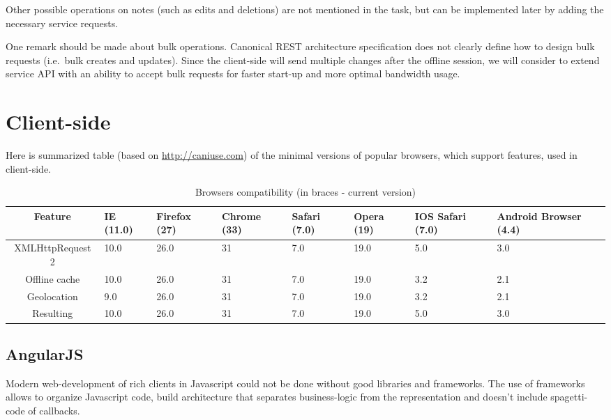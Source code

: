 \documentclass[12pt,a4paper]{article}
\begin{document}
Other possible operations on notes (such as edits and deletions) are
not mentioned in the task, but can be implemented later by adding the
necessary service requests.

One remark should be made about bulk operations. Canonical REST
architecture specification does not clearly define how to design bulk
requests (i.e.\ bulk creates and updates). Since the client-side will
send multiple changes after the offline session, we will consider to
extend service API with an ability to accept bulk requests for faster
start-up and more optimal bandwidth usage.

\section{Client-side}

Here is summarized table (based on \url{http://caniuse.com}) of the minimal
versions of popular browsers, which support features, used in client-side.

\begin{table}[h!]
    \caption{Browsers compatibility (in braces - current version)}
    \begin{tabularx}{\linewidth}{|c|X|X|X|X|X|X|X|}
        \hline
        Feature & IE (11.0) & Firefox (27) & Chrome (33) & Safari (7.0) & Opera (19) & IOS Safari (7.0) & Android Browser (4.4) \\ \hline
        XMLHttpRequest 2 & 10.0 & 26.0 & 31 & 7.0 & 19.0 & 5.0 & 3.0 \\ \hline
        Offline cache    & 10.0 & 26.0 & 31 & 7.0 & 19.0 & 3.2 & 2.1 \\ \hline
        Geolocation      &  9.0 & 26.0 & 31 & 7.0 & 19.0 & 3.2 & 2.1 \\ \hline
        \hline
        Resulting        & 10.0 & 26.0 & 31 & 7.0 & 19.0 & 5.0 & 3.0 \\ \hline
    \end{tabularx}
\end{table}

\subsection{AngularJS}
Modern web-development of rich clients in Javascript could not be done without
good libraries and frameworks. The use of frameworks allows to organize
Javascript code, build architecture that separates business-logic from the
representation and doesn't include spagetti-code of callbacks.
\end{document}
